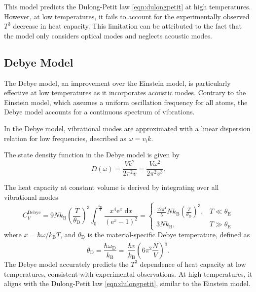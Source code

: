 This model predicts the Dulong-Petit law \eqref{eqn:dulongpetit} at high temperatures. However, 
at low temperatures, it fails to account for the experimentally observed $T^3$ 
decrease in heat capacity. This limitation can be attributed to the fact that 
the model only considers optical modes and neglects acoustic modes.

\subsection{Debye Model}

The Debye model, an improvement over the Einstein model, 
is particularly effective at low temperatures as it incorporates acoustic modes. 
Contrary to the Einstein model, which assumes a uniform oscillation frequency for all atoms, 
the Debye model accounts for a continuous spectrum of vibrations.

In the Debye model, vibrational modes are approximated with a linear dispersion relation 
for low frequencies, described as $\omega = v_i k$. 

The state density function in the Debye model is given by
\begin{equation}
    D(\omega) = \frac{Vk^2}{2\pi^2v} = \frac{V\omega^2}{2\pi^2 v^3}.
    \label{eqn:sdf}
\end{equation}

The heat capacity at constant volume is derived by integrating over all vibrational modes
\begin{equation}
    C_V^\text{Debye} = 9Nk_\text{B} \left(\frac{T}{\theta_\text{D}}\right)^3 \int_0^{\frac{\theta_\text{D}}{T}} 
    \frac{x^4\text{e}^x \; \text{d}x}{(\text{e}^x - 1)^2} = 
    \begin{cases}
        \frac{12\pi^4}{5}Nk_\text{B}\left(\frac{T}{\theta_\text{D}}\right)^3, & T \ll \theta_\text{E} \\
        3Nk_\text{B} , & T \gg \theta_\text{E}
    \end{cases}
\end{equation}
where  \( x = \hbar\omega / k_\text{B}T \), and
$\theta_\text{D}$ is the material-specific Debye temperature, defined as 
\begin{equation}
    \theta_\text{D} = \frac{\hbar\omega_\text{D}}{k_\text{B}} = \
    \frac{\hbar v}{k_\text{B}} \left(6\pi^2\frac{N}{V}\right)^{\frac{1}{3}}.
    \label{eqn:Debye}
\end{equation}
The Debye model accurately predicts the $T^3$ dependence of heat capacity at low temperatures, 
consistent with experimental observations. 
At high temperatures, it aligns with the Dulong-Petit law \eqref{eqn:dulongpetit}, 
similar to the Einstein model.

